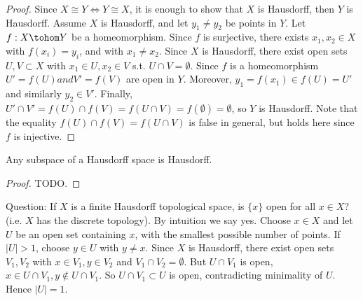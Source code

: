 \begin{proof}
  Since $X\cong Y\iff Y\cong X$, it is enough to show that $X$ is Hausdorff,
  then $Y$ is Hausdorff. Assume $X$ is Hausdorff, and let $y_1\neq y_2$ be
  points in $Y$.  Let $f:X\tohom Y$ be a homeomorphism. Since $f$ is surjective,
  there exists $x_1,x_2\in X$ with $f(x_i)=y_i$, and with $x_1\neq x_2$. Since
  $X$ is Hausdorff, there exist open sets $U,V\subset X$ with $x_1\in U, x_2\in
  V$ s.t. $U\cap V=\emptyset$. Since $f$ is a homeomorphism $U'=f(U) and
  V'=f(V)$ are open in $Y$. Moreover, $y_1=f(x_1)\in f(U)=U'$ and similarly
  $y_2\in V'$. Finally, $U'\cap V'=f(U)\cap f(V)=f(U\cap
  V)=f(\emptyset)=\emptyset$, so $Y$ is Hausdorff. Note that the equality
  $f(U)\cap f(V)=f(U\cap V)$ is false in general, but holds here since $f$ is
  injective.
\end{proof}

\begin{proposition}
  Any subspace of a Hausdorff space is Hausdorff.
  \label{<+label+>}
\end{proposition}
\begin{proof}
  TODO.
\end{proof}

Question: If $X$ is a finite Hausdorff topological space, is $\{x\}$ open for
all $x\in X$? (i.e. $X$ has the discrete topology). By intuition we say yes.
Choose $x\in X$ and let $U$ be an open set containing $x$, with the smallest
possible number of points. If $|U|>1$, choose $y\in U$ with $y\neq x$. Since $X$
is Hausdorff, there exist open sets $V_1,V_2$ with $x\in V_1, y\in V_2$ and
$V_1\cap V_2 =\emptyset$. But $U\cap V_1$ is open, $x\in U\cap V_1,
y\not\in U\cap V_1$. So $U\cap V_1\subset U$ is open, contradicting minimality
of $U$. Hence $|U|=1$.
